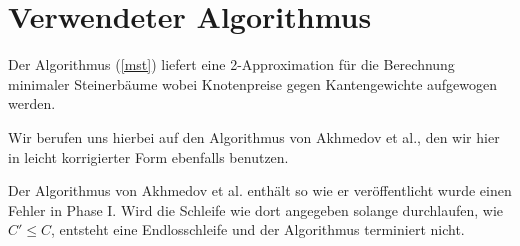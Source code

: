 \documentclass[a4paper,10pt]{article}
\begin{document}
\section{Verwendeter Algorithmus}
\label{sec:mst}
Der Algorithmus (\ref{mst}) liefert eine 2-Approximation für die Berechnung minimaler Steinerbäume wobei Knotenpreise gegen Kantengewichte aufgewogen werden.

Wir berufen uns hierbei auf den Algorithmus von Akhmedov et al.\citep{akhmedov2014}, den wir hier in leicht korrigierter Form ebenfalls benutzen.\smallskip

Der Algorithmus von Akhmedov et al. enthält so wie er veröffentlicht wurde einen Fehler in Phase I. Wird die Schleife wie dort angegeben solange durchlaufen, wie $C' \leq C$, entsteht eine Endlosschleife und der Algorithmus terminiert nicht.
\bigskip
\end{document}
